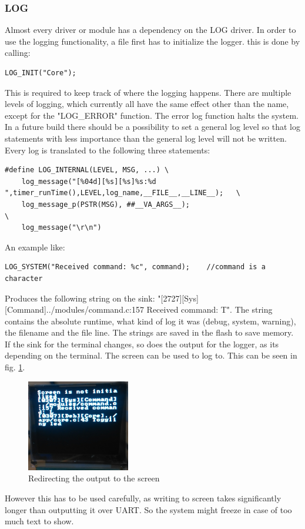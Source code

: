 \subsubsection{LOG}
Almost every driver or module has a dependency on the LOG driver. In order to use the logging functionality, a file first has to initialize the logger. this is done by calling:
\begin{verbatim}
LOG_INIT("Core");
\end{verbatim}
This is required to keep track of where the logging happens. There are multiple levels of logging, which currently all have the same effect other than the name, except for the "LOG\_ERROR" function. The error log function halts the system. In a future build there should be a possibility to set a general log level so that log statements with less importance than the general log level will not be written. Every log is translated to the following three statements:
\begin{verbatim}
#define LOG_INTERNAL(LEVEL, MSG, ...) \
	log_message("[%04d][%s][%s]%s:%d ",timer_runTime(),LEVEL,log_name,__FILE__,__LINE__);   \
	log_message_p(PSTR(MSG), ##__VA_ARGS__);                                                        \
	log_message("\r\n")
\end{verbatim}
An example like:
\begin{verbatim}
LOG_SYSTEM("Received command: %c", command);	//command is a character
\end{verbatim}
Produces the following string on the sink: "[2727][Sys][Command]../modules/command.c:157 Received command: T". The string contains the absolute runtime, what kind of log it was (debug, system, warning), the filename and the file line. The strings are saved in the flash to save memory. If the sink for the terminal changes, so does the output for the logger, as its depending on the terminal. The screen can be used to log to. This can be seen in fig. \ref{fig:screen_logger}.
\begin{figure}[H]
	\centering
	\label{fig:screen_logger}
	\includegraphics[width=0.4\textwidth]{./fig/screen_logger.png}
	\caption{Redirecting the output to the screen}
\end{figure}
However this has to be used carefully, as writing to screen takes significantly longer than outputting it over UART. So the system might freeze in case of too much text to show.
